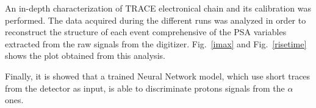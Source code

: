 An in-depth characterization of TRACE electronical chain and its calibration was performed. The data acquired during the different runs was analyzed in order to reconstruct the structure of each event comprehensive of the PSA variables extracted from the raw signals from the digitizer. Fig.~\ref{imax} and Fig.~\ref{risetime} shows the plot obtained from this analysis.

Finally, it is showed that a trained Neural Network model, which use short traces from the detector as input, is able to discriminate protons signals from the $\alpha$ ones.
